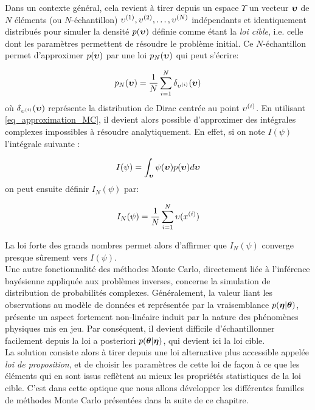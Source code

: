 Dans un contexte général, cela revient à tirer depuis un espace $\Upsilon$ un vecteur ${\bm{\upsilon}}$ de $N$ éléments (ou $N$-échantillon) ${\upsilon}^{(1)}, {\upsilon}^{(2)}, \dots, {\upsilon}^{(N)}$ indépendants et identiquement distribués pour simuler la densité $p({\bm{\upsilon}})$ définie comme étant la \textit{loi cible}, i.e. celle dont les paramètres permettent de résoudre le problème initial. Ce $N$-échantillon permet d'approximer $p({\bm{\upsilon}})$ par une loi $p_N({\bm{\upsilon}})$ qui peut s'écrire:

\begin{equation}
p_N({\bm{\upsilon}}) = \dfrac{1}{N} \sum\limits_{i=1}^N\delta_{{\upsilon}^{(i)}}({\bm{\upsilon}})
\label{eq_approximation_MC}
\end{equation}
où $\delta_{{\upsilon}^{(i)}}({\bm{\upsilon}})$ représente la distribution de Dirac centrée au point ${\upsilon}^{(i)}$. En utilisant \eqref{eq_approximation_MC}, il devient alors possible d'approximer des intégrales complexes impossibles à résoudre analytiquement. En effet, si on note $I(\psi)$ l'intégrale suivante : 

\begin{equation}
I(\psi) = \int_{\mathcal{{\bm{\upsilon}}}} \psi({\bm{\upsilon}})p({\bm{\upsilon}})d{\bm{\upsilon}}
\label{eq_integrale_MC_intractable}
\end{equation}
on peut ensuite définir $I_N(\psi)$ par:

\begin{equation}
I_N(\psi) = \dfrac{1}{N} \sum\limits_{i=1}^N {\upsilon}(x^{(i)})
\label{eq_integrale_MC_approximation}
\end{equation}

La loi forte des grands nombres permet alors d'affirmer que $I_N(\psi)$ converge presque sûrement vers $I(\psi)$.\\


Une autre fonctionnalité des méthodes Monte Carlo, directement liée à l'inférence bayésienne appliquée aux problèmes inverses, concerne la simulation de distribution de probabilités complexes. Généralement, la valeur liant les observations au modèle de données et représentée par la vraisemblance $p({\bm{\eta}} |{\bm{\theta}})$, présente un aspect fortement non-linéaire induit par la nature des phénomènes physiques mis en jeu. Par conséquent, il devient difficile d'échantillonner facilement depuis la loi a posteriori ${p({\bm{\theta}} | {\bm{\eta}})}$, qui devient ici la loi cible.\\

La solution consiste alors à tirer depuis une loi alternative plus accessible appelée \textit{loi de proposition}, et de choisir les paramètres de cette loi de façon à ce que les éléments qui en sont issus reflètent au mieux les propriétés statistiques de la loi cible. C'est dans cette optique que nous allons développer les différentes familles de méthodes Monte Carlo présentées dans la suite de ce chapitre.\\

